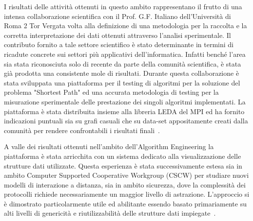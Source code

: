 \documentclass[11pt,a4paper,sans]{moderncv}        %
\begin{document}
{
I risultati delle attività ottenuti in questo ambito rappresentano il frutto di una intensa collaborazione scientifica con il Prof. G.F. Italiano dell’Università di Roma 2 Tor Vergata volta alla definizione di una metodologia per la raccolta e la corretta interpretazione dei dati ottenuti attraverso l'analisi sperimentale. Il contributo fornito a tale settore scientifico  è stato determinante in termini di ricadute concrete sui settori più applicativi dell’informatica. Infatti benché l'area sia stata riconosciuta solo di recente da parte della comunità scientifica, è stata  già prodotta una consistente mole di risultati. Durante questa collaborazione è stata sviluppata una piattaforma per il testing di algoritmi per la soluzione del problema "Shortest Path" ed una accurata metodologia di testing per la misurazione sperimentale delle prestazione dei singoli algoritmi implementati. La piattaforma è stata distribuita insieme alla libreria LEDA del MPI ed ha fornito indicazioni puntuali sia su grafi casuali che su data-set appositamente creati dalla comunità per rendere confrontabili i risultati finali~\cite{SODA96:1,jea:97,Amato1997316,ALEX:98,acms:99,Cattaneo2002111,Cattaneo2010404}. 
}

{
A valle dei risultati ottenuti nell'ambito dell'Algorithm Engineering la piattaforma è stata arricchita con un sistema dedicato alla visualizzazione delle strutture dati utilizzate. Questa esperienza è stata successivamente estesa sia in ambito Computer Supported Cooperative Workgroup (CSCW) per studiare nuovi modelli di interazione a distanza, sia in ambito sicurezza, dove la complessità dei protocolli richiede necessariamente un maggior livello di astrazione. L'approccio si è dimostrato particolarmente utile ed abilitante essendo basato primariamente su alti livelli di genericità e riutilizzabilità delle strutture dati impiegate~\cite{RETIS:97,ECOM:2,CABOTO:98,Barra199811,IFIP:98,WSDAL:00,Cattaneo2002391,Cattaneo200441,Cattaneo2008258,Cattaneo2009}.
}
\end{document}
